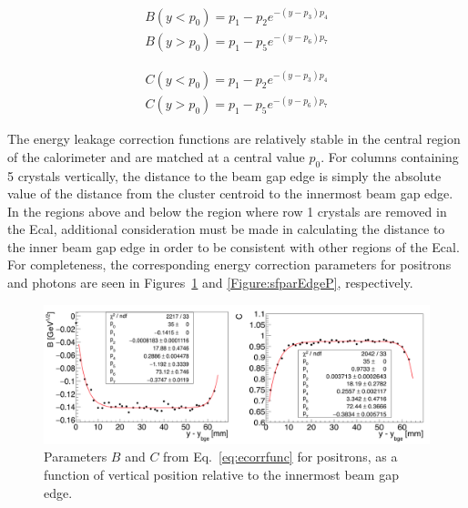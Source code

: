 \documentclass[12pt]{report}
\begin{document}
\begin{equation}
\begin{split}
\label{eq:p1parlt}
B(y<p_0) = p_1-p_2 e^{-(y-p_3)p_4}\\
B(y>p_0) = p_1-p_5 e^{-(y-p_6)p_7}
\end{split}
\end{equation}

\begin{equation}
\begin{split}
\label{eq:p2parlt}
C(y<p_0) = p_1-p_2 e^{-(y-p_3)p_4}\\
C(y>p_0) = p_1-p_5 e^{-(y-p_6)p_7}
\end{split}
\end{equation}

The energy leakage correction functions are relatively stable in the central region of the calorimeter and are matched at a central value $p_0$. For columns containing 5 crystals vertically, the distance to the beam gap edge is simply the absolute value of the distance from the cluster centroid to the innermost beam gap edge. In the regions above and below the region where row 1 crystals are removed in the Ecal, additional consideration must be made in calculating the distance to the inner beam gap edge in order to be consistent with other regions of the Ecal. For completeness, the corresponding energy correction parameters for positrons and photons are seen in Figures~\ref{Figure:sfparEdgeEP} and \ref{Figure:sfparEdgeP}, respectively. 


\begin{figure}[H]
  \centering
      \includegraphics[width=1.0\textwidth]{pics/performance/sfparEdge_ep.png}
  \caption[Ecal energy shower parameters for positrons relative to the inside beam gap edge]{Parameters $B$ and $C$ from Eq.~\ref{eq:ecorrfunc} for positrons, as a function of vertical position
relative to the innermost beam gap edge.}
  \label{Figure:sfparEdgeEP}
\end{figure}
\end{document}
